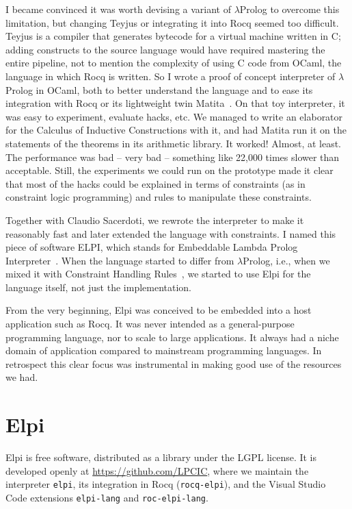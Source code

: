 \documentclass[a4paper, 11pt]{book}
\begin{document}
I became convinced it was worth devising a variant of $\lambda$Prolog to
overcome this limitation, but changing Teyjus or integrating it into Rocq seemed
too difficult. Teyjus is a compiler that generates bytecode for a virtual
machine written in C; adding constructs to the source language would have
required mastering the entire pipeline, not to mention the complexity of using
C code from OCaml, the language in which Rocq is written. So I wrote a proof of
concept interpreter of $\lambda$Prolog in OCaml, both to better understand the
language and to ease its integration with Rocq or its lightweight twin
Matita~\cite{DBLP:conf/cade/AspertiRCT11}. On that toy interpreter, it was easy
to experiment, evaluate hacks, etc. We managed to write an elaborator for
the Calculus of Inductive Constructions with it, and had Matita run it on the
statements of the theorems in its arithmetic library. It worked! Almost, at
least. The performance was bad -- very bad -- something like 22,000 times
slower than acceptable. Still, the experiments we could run on the prototype
made it clear that most of the hacks could be explained in terms of constraints
(as in constraint logic programming) and rules to manipulate these constraints.

Together with Claudio Sacerdoti, we rewrote the interpreter to make it
reasonably fast and later extended the language with constraints. I named this
piece of software ELPI, which stands for Embeddable Lambda Prolog
Interpreter~\cite{dunchev15lpar}. When the language started to differ from
$\lambda$Prolog, i.e., when we mixed it with Constraint Handling
Rules~\cite{FRUHWIRTH199895}, we started to use Elpi for the language itself,
not just the implementation.

From the very beginning, Elpi was conceived to be embedded into a host
application such as Rocq. It was never intended as a general-purpose
programming language, nor to scale to large applications. It always had a niche
domain of application compared to mainstream programming languages.
In retrospect this clear focus was instrumental in making good use of the resources
we had.

\section{Elpi}


Elpi is free software, distributed as a library under the LGPL license. It is
developed openly at \url{https://github.com/LPCIC}, where we maintain the
interpreter \texttt{elpi}, its integration in Rocq (\texttt{rocq-elpi}), and
the Visual Studio Code extensions \texttt{elpi-lang} and \texttt{roc-elpi-lang}.
\end{document}
